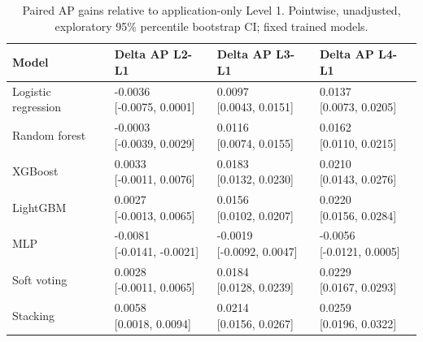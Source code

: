 \begin{table}[htbp]
\centering
\small
\caption{Paired AP gains relative to application-only Level 1. Pointwise, unadjusted, exploratory 95\% percentile bootstrap CI; fixed trained models.}
\label{tab:rq2-baseline-gains}
\begin{tabular}{llll}
\toprule
Model & Delta AP L2-L1 & Delta AP L3-L1 & Delta AP L4-L1 \\
\midrule
Logistic regression & \shortstack{{-0.0036} \\ {[-0.0075, 0.0001]}} & \shortstack{{0.0097} \\ {[0.0043, 0.0151]}} & \shortstack{{0.0137} \\ {[0.0073, 0.0205]}} \\
Random forest & \shortstack{{-0.0003} \\ {[-0.0039, 0.0029]}} & \shortstack{{0.0116} \\ {[0.0074, 0.0155]}} & \shortstack{{0.0162} \\ {[0.0110, 0.0215]}} \\
XGBoost & \shortstack{{0.0033} \\ {[-0.0011, 0.0076]}} & \shortstack{{0.0183} \\ {[0.0132, 0.0230]}} & \shortstack{{0.0210} \\ {[0.0143, 0.0276]}} \\
LightGBM & \shortstack{{0.0027} \\ {[-0.0013, 0.0065]}} & \shortstack{{0.0156} \\ {[0.0102, 0.0207]}} & \shortstack{{0.0220} \\ {[0.0156, 0.0284]}} \\
MLP & \shortstack{{-0.0081} \\ {[-0.0141, -0.0021]}} & \shortstack{{-0.0019} \\ {[-0.0092, 0.0047]}} & \shortstack{{-0.0056} \\ {[-0.0121, 0.0005]}} \\
Soft voting & \shortstack{{0.0028} \\ {[-0.0011, 0.0065]}} & \shortstack{{0.0184} \\ {[0.0128, 0.0239]}} & \shortstack{{0.0229} \\ {[0.0167, 0.0293]}} \\
Stacking & \shortstack{{0.0058} \\ {[0.0018, 0.0094]}} & \shortstack{{0.0214} \\ {[0.0156, 0.0267]}} & \shortstack{{0.0259} \\ {[0.0196, 0.0322]}} \\
\bottomrule
\end{tabular}
\end{table}
